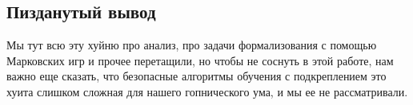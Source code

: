 \subsection*{Пизданутый вывод}

Мы тут всю эту хуйню про анализ, про задачи формализования с помощью Марковских игр и прочее перетащили, но чтобы не соснуть в этой работе, нам важно еще сказать, что безопасные алгоритмы обучения с подкреплением это хуита слишком сложная для нашего гопнического ума, и мы ее не рассматривали.
